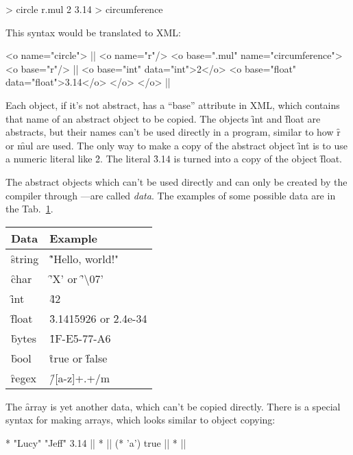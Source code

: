 \begin{eocode}
[r] > circle
  r.mul 2 3.14 > circumference
\end{eocode}

This syntax would be translated to XML:

\begin{eocode}
<o name="circle"> |$\label{ln:xml-circle}$|
  <o name="r"/>
  <o base=".mul" name="circumference">
    <o base="r"/>  |$\label{ln:xml-circle-r}$|
    <o base="int" data="int">2</o>
    <o base="float" data="float">3.14</o>
  </o>
</o> |$\label{ln:xml-circle-end}$|
\end{eocode}

Each object, if it's not abstract, has a ``base'' attribute in XML,
which contains that name of an abstract object to be copied. The
objects \f{int} and \f{float} are abstracts, but their names
can't be used directly in a program, similar to how \f{r} or \f{mul}
are used. The only way to make a copy of the abstract object \f{int}
is to use a numeric literal like \f{2}. The literal \f{3.14}
is turned into a copy of the object \f{float}.

The abstract objects which can't be used directly and can only be
created by the compiler through ---are called \emph{data}.
The examples of some possible data are in the Tab.~\ref{tab:types}.

\begin{table}[H]
\begin{tabular}{|l|l|}
\hline
Data & Example \\
\hline
\f{string} & \f{"Hello, world!"} \\
\f{char} & \f{'X'} or \f{'\textbackslash{}07'} \\
\f{int} & \f{42} \\
\f{float} & \f{3.1415926} or \f{2.4e-34} \\
\f{bytes} & \f{1F-E5-77-A6} \\
\f{bool} & \f{true} or \f{false} \\
\f{regex} & \f{/[a-z]+.+/m} \\
\hline
\end{tabular}
\label{tab:types}
\end{table}

The \f{array} is yet another data, which can't be copied
directly. There is a special syntax for making arrays,
which looks similar to object copying:

\begin{eocode}
* "Lucy" "Jeff" 3.14 |$\label{ln:array-1}$|
* |$\label{ln:array-2a}$|
  (* 'a')
  true |$\label{ln:array-2b}$|
* |$\label{ln:array-3}$|
\end{eocode}

